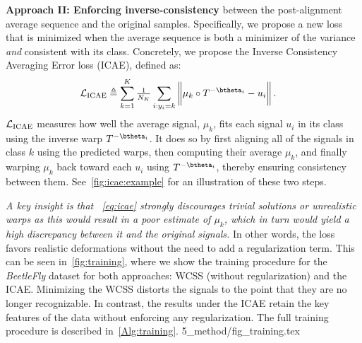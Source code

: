 \textbf{Approach II: Enforcing inverse-consistency} between the post-alignment average sequence and the original samples.
Specifically, we propose a new loss that is minimized when the average sequence is both a minimizer of the variance \emph{and} consistent with its class.  Concretely, we propose the Inverse Consistency Averaging Error loss (ICAE), defined as:
\begin{align}\label{eq:icae}
\Lcal_{\mathrm{ICAE}}&\triangleq \sum_{k=1}^K 
 \tfrac{1}{N_K}\sum_{i:y_i=k}\bigg\| \mu_k\circ T^{-\btheta_i}- u_i\bigg\|\, . 
\end{align}
$\mathcal{L}_{\mathrm{ICAE}}$ measures how well the average signal, $ \mu_k$, fits each signal $u_i$ in its class using the inverse warp $T^{-\btheta_i}$. It does so by first aligning all of the signals in class $k$ using the predicted warps,
then computing their average $ \mu_k$, and finally warping $ \mu_k$ back toward each $u_i$ using $T^{-\btheta_i}$, 
thereby ensuring consistency between them. See~\autoref{fig:icae:example} for an illustration of these two steps.

\emph{A key insight is that ~\autoref{eq:icae} strongly discourages trivial solutions or unrealistic warps as this would result in a poor estimate of $ \mu_k$, which in turn would yield a high discrepancy between it and the original signals.} In other words, the loss favors 
realistic deformations without the need to add a regularization term. This can be seen in~\autoref{fig:training}, where we show the training procedure for the \emph{BeetleFly} dataset for both approaches: WCSS (without regularization) and the ICAE. Minimizing the WCSS distorts the signals to the point that they are no longer recognizable. In contrast, the results under the ICAE retain the key features of the data without enforcing any regularization. 
The full training procedure is described in~\autoref{Alg:training}.
%
{5_method/fig_training.tex}
%
